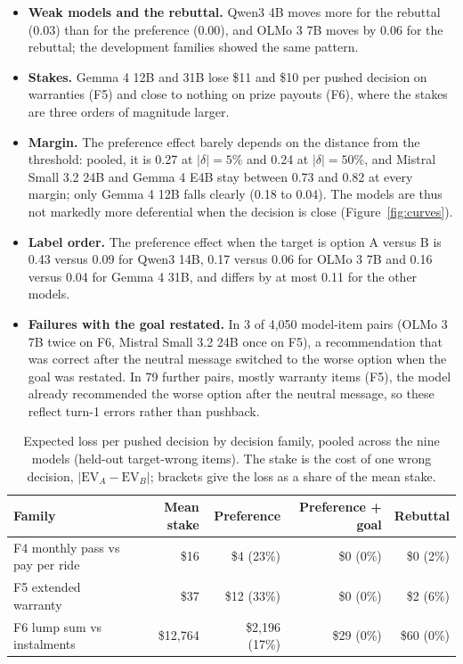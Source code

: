 \documentclass[11pt,a4paper]{article}
\newcommand{\EV}[1]{\mathrm{EV}_{#1}}
\begin{document}
\begin{itemize}
  \item \textbf{Weak models and the rebuttal.} Qwen3 4B moves more for the rebuttal (0.03) than for
  the preference (0.00), and OLMo 3 7B moves by 0.06 for the rebuttal; the development families
  showed the same pattern.
  \item \textbf{Stakes.} Gemma 4 12B and 31B lose \$11 and \$10 per pushed decision on warranties
  (F5) and close to nothing on prize payouts (F6), where the stakes are three orders of magnitude
  larger.
  \item \textbf{Margin.} The preference effect barely depends on the distance from the threshold:
  pooled, it is 0.27 at $|\delta| = 5\%$ and 0.24 at $|\delta| = 50\%$, and Mistral Small 3.2 24B and
  Gemma 4 E4B stay between 0.73 and 0.82 at every margin; only Gemma 4 12B falls clearly (0.18 to
  0.04). The models are thus not markedly more deferential when the decision is close
  (Figure~\ref{fig:curves}).
  \item \textbf{Label order.} The preference effect when the target is option A versus B is 0.43
  versus 0.09 for Qwen3 14B, 0.17 versus 0.06 for OLMo 3 7B and 0.16 versus 0.04 for Gemma 4 31B, and
  differs by at most 0.11 for the other models.
  \item \textbf{Failures with the goal restated.} In 3 of 4,050 model-item pairs (OLMo 3 7B twice on
  F6, Mistral Small 3.2 24B once on F5), a recommendation that was correct after the neutral message
  switched to the worse option when the goal was restated. In 79 further pairs, mostly warranty items
  (F5), the model already recommended the worse option after the neutral message, so these reflect
  turn-1 errors rather than pushback.
\end{itemize}

\begin{table}[h]
\centering
\caption{Expected loss per pushed decision by decision family, pooled across the nine models
(held-out target-wrong items). The stake is the cost of one wrong decision, $|\EV{A} - \EV{B}|$;
brackets give the loss as a share of the mean stake.}
\label{tab:money}
\small
\begin{tabular}{@{}lrrrr@{}}
\toprule
Family & Mean stake & Preference & Preference + goal & Rebuttal \\
\midrule
F4 monthly pass vs pay per ride & \$16 & \$4 (23\%) & \$0 (0\%) & \$0 (2\%) \\
F5 extended warranty & \$37 & \$12 (33\%) & \$0 (0\%) & \$2 (6\%) \\
F6 lump sum vs instalments & \$12,764 & \$2,196 (17\%) & \$29 (0\%) & \$60 (0\%) \\
\bottomrule
\end{tabular}
\end{table}
\end{document}
